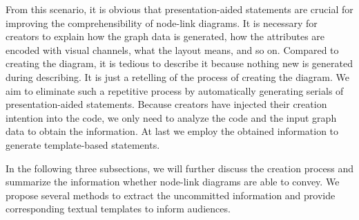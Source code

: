 From this scenario, it is obvious that presentation-aided statements are crucial for improving the comprehensibility of node-link diagrams.
It is necessary for creators to explain how the graph data is generated, how the attributes are encoded with visual channels, what the layout means, and so on.
Compared to creating the diagram, it is tedious to describe it because nothing new is generated during describing.
It is just a retelling of the process of creating the diagram.
We aim to eliminate such a repetitive process by automatically generating serials of presentation-aided statements.
Because creators have injected their creation intention into the code, we only need to analyze the code and the input graph data to obtain the information. At last we employ the obtained information to generate template-based statements.

In the following three subsections, we will further discuss the creation process and summarize the information whether node-link diagrams are able to convey.
We propose several methods to extract the uncommitted information and provide corresponding textual templates to inform audiences.


